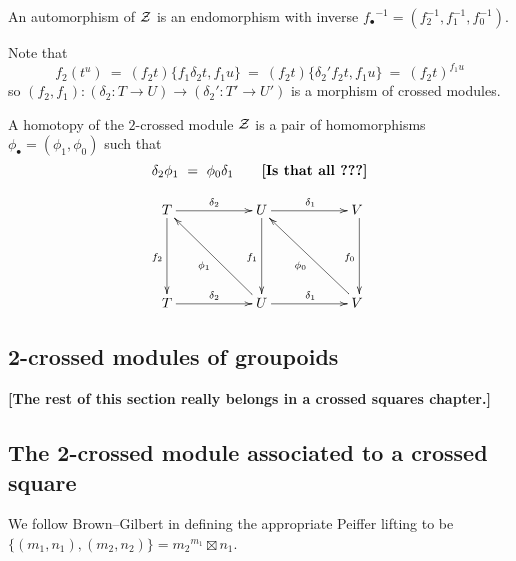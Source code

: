 \noindent
An automorphism of $\mathcal{Z}$ is an endomorphism with inverse
${f_{\bullet}}^{-1} = (f_2^{-1},f_1^{-1},f_0^{-1})$.

Note that
$$
f_2(t^u) ~=~ (f_2t)\{f_1\delta_2t,f_1u\}
         ~=~ (f_2t)\{\delta_2'f_2t,f_1u\}
         ~=~ (f_2t)^{f_1u}
$$
so $(f_2,f_1) : (\delta_2 : T \to U) \to (\delta_2' : T' \to U')$ 
is a morphism of crossed modules.

\begin{defn} 
A homotopy of the $2$-crossed module $\mathcal{Z}$
is a pair of homomorphisms $\phi_{\bullet} = (\phi_1,\phi_0)$
such that 
$$
\delta_2\phi_1 ~=~ \phi_0\delta_1 \qquad\mbox{{\bf [Is that all~???]}}
$$
\end{defn}
$$
\xymatrix{
    T \ar[rr]^{\delta_2} \ar[dd]_{f_2}
    &&  U \ar[rr]^{\delta_1} \ar[dd]_{f_1}
        && V~ \ar[dd]_{f_0} \\
    &&  &&  \\
    T \ar[rr]^{\delta_2} 
    &&  U \ar[rr]^{\delta_1} \ar[lluu]^{\phi_1}
        && V~ \ar[lluu]^{\phi_0}  \\
}
$$



\subsection{2-crossed modules of groupoids}  \label{subsec:2xmod-gpd}










\newpage
\vspace*{5mm}
\begin{center}
{\bf [The rest of this section really belongs in a crossed squares chapter.]}
\end{center}

\vspace*{10mm}
\subsection{The 2-crossed module associated to a crossed square}

We follow Brown--Gilbert \cite{brow:gilb} in defining the appropriate 
Peiffer lifting to be 
$\{(m_1, n_1),(m_2,n_2) \} = {m_2}^{m_1} \boxtimes n_1$.

